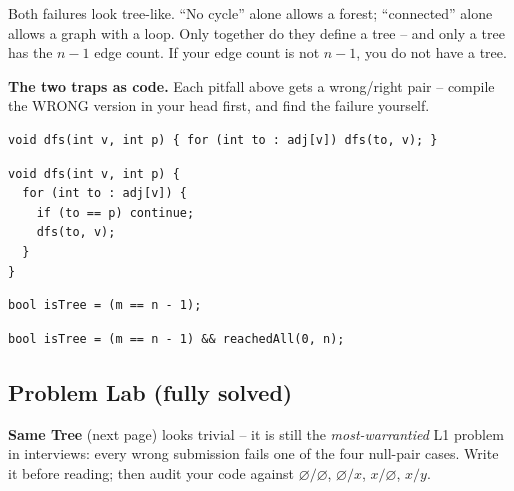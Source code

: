 \begin{warningbox}
Both failures look tree-like. ``No cycle'' alone allows a forest; ``connected'' alone
allows a graph with a loop. Only together do they define a tree -- and only a tree has
the $n-1$ edge count. If your edge count is not $n-1$, you do not have a tree.
\end{warningbox}

\smallskip\noindent\textbf{The two traps as code.} Each pitfall above gets a wrong/right
pair -- compile the WRONG version in your head first, and find the failure yourself.

\vspace{2pt}
\begin{lstlisting}[caption={\textcolor{warningred}{WRONG -- no parent guard:} A->B->A->B forever}, basicstyle=\ttfamily\small]
void dfs(int v, int p) { for (int to : adj[v]) dfs(to, v); }
\end{lstlisting}
\begin{lstlisting}[caption={\textcolor{successgreen}{RIGHT -- skip where you came from}}, basicstyle=\ttfamily\small]
void dfs(int v, int p) {
  for (int to : adj[v]) {
    if (to == p) continue;
    dfs(to, v);
  }
}
\end{lstlisting}

\vspace{2pt}
\begin{lstlisting}[caption={\textcolor{warningred}{WRONG -- edge count alone:} a triangle plus an isolated node passes}, basicstyle=\ttfamily\small]
bool isTree = (m == n - 1);
\end{lstlisting}
\begin{lstlisting}[caption={\textcolor{successgreen}{RIGHT -- count and reach}}, basicstyle=\ttfamily\small]
bool isTree = (m == n - 1) && reachedAll(0, n);
\end{lstlisting}

\subsection{Problem Lab (fully solved)}

\begin{attemptgate}
\textbf{Same Tree} (next page) looks trivial -- it is still the \emph{most-warrantied}
L1 problem in interviews: every wrong submission fails one of the four
null-pair cases. Write it before reading; then audit your code against
$\varnothing/\varnothing$, $\varnothing/x$, $x/\varnothing$, $x/y$.
\end{attemptgate}

